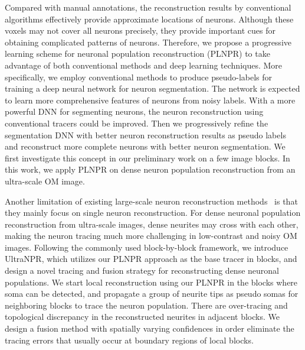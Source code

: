Compared with manual annotations, the reconstruction results by conventional algorithms effectively provide approximate locations of neurons. 
Although these voxels may not cover all neurons precisely, they provide important cues for obtaining complicated patterns of neurons.
Therefore, we propose a progressive learning scheme for neuronal population reconstruction (PLNPR) to take advantage of both conventional methods and deep learning techniques.
More specifically, we employ conventional methods to produce pseudo-labels for training a deep neural network for neuron segmentation. 
The network is expected to learn more comprehensive features of neurons from noisy labels. 
With a more powerful DNN for segmenting neurons, the neuron reconstruction using conventional tracers could be improved. 
Then we progressively refine the segmentation DNN with better neuron reconstruction results as pseudo labels and reconstruct more complete neurons with better neuron segmentation.
We first investigate this concept in our preliminary work \cite{Zhao2019} on a few image blocks. 
In this work, we apply PLNPR on dense neuron population reconstruction from an ultra-scale OM image. 

Another limitation of existing large-scale neuron reconstruction methods~\cite{Zhou2015, Peng2017, Wang2018} is that they mainly focus on single neuron reconstruction. 
%
For dense neuronal population reconstruction from ultra-scale images, dense neurites may cross with each other, making the neuron tracing much more challenging in low-contrast and noisy OM images. 
% 
Following the commonly used block-by-block framework, we introduce UltraNPR, which utilizes our PLNPR approach as the base tracer in blocks, and design a novel tracing and fusion strategy for reconstructing dense neuronal populations.
%
We start local reconstruction using our PLNPR in the blocks where soma can be detected, and propagate a group of neurite tips as pseudo somas for neighboring blocks to trace the neuron population. 
%
There are over-tracing and topological discrepancy in the reconstructed neurites in adjacent blocks. 
We design a fusion method with spatially varying confidences in order eliminate the tracing errors that usually occur at boundary regions of local blocks.   


